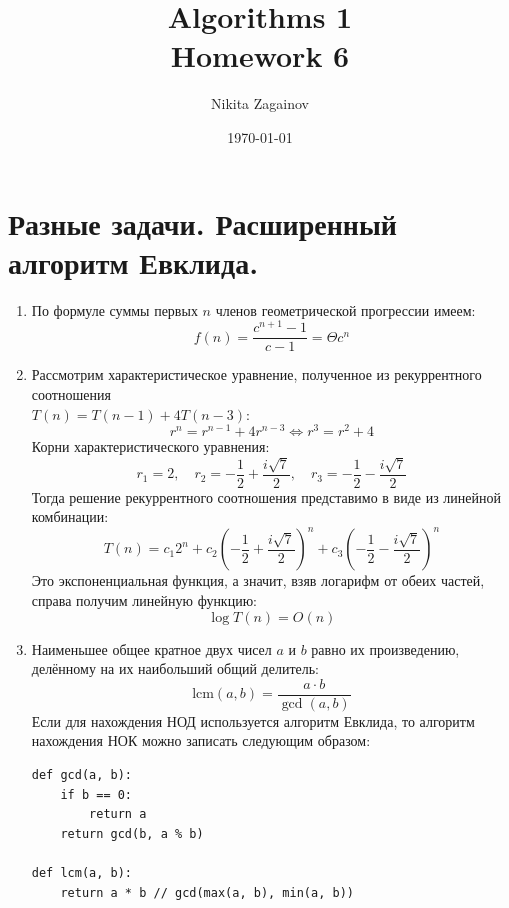 \documentclass{article}
\title{Algorithms 1 \\ Homework 6}
\author{Nikita Zagainov}
\date{\today}
\begin{document}
\maketitle

\section{Разные задачи. Расширенный алгоритм Евклида.}
\begin{enumerate}
    \item
          По формуле суммы первых $n$ членов
          геометрической прогрессии имеем:
          \[
              f(n) = \frac{c^{n + 1} - 1}{c - 1} = \Theta{c^n}
          \]

    \item
          Рассмотрим характеристическое уравнение,
          полученное из рекуррентного соотношения \\
          $T(n) = T(n - 1) + 4T(n - 3)$:
          \[
              r^n = r^{n - 1} + 4r^{n - 3} \Longleftrightarrow
              r^3 = r^2 + 4
          \]
          Корни характеристического уравнения:
          \[
              r_1 = 2,
              \quad r_2 = -\frac{1}{2} + \frac{i\sqrt{7}}{2},
              \quad r_3 = -\frac{1}{2} - \frac{i\sqrt{7}}{2}
          \]
          Тогда решение рекуррентного соотношения представимо
          в виде из линейной комбинации:
          \[
              T(n) = c_1 2^n +
              c_2 \left(-\frac{1}{2} + \frac{i\sqrt{7}}{2}\right)^n +
              c_3 \left(-\frac{1}{2} - \frac{i\sqrt{7}}{2}\right)^n
          \]
          Это экспоненциальная функция, а значит,
          взяв логарифм от обеих частей, справа
          получим линейную функцию:
          \[
              \log T(n) = O(n)
          \]

    \item
          Наименьшее общее кратное двух чисел $a$ и $b$ равно
          их произведению, делённому на их наибольший общий делитель:
          \[
              \mathrm{lcm}(a, b) = \frac{a \cdot b}{\gcd(a, b)}
          \]
          Если для нахождения НОД используется алгоритм Евклида,
          то алгоритм нахождения НОК можно записать следующим образом:
          \begin{lstlisting}
def gcd(a, b):
    if b == 0:
        return a
    return gcd(b, a % b)

def lcm(a, b):
    return a * b // gcd(max(a, b), min(a, b))
          \end{lstlisting}


\end{enumerate}
\end{document}
